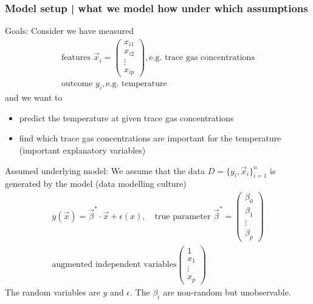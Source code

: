 \subsubsection{Model setup | what we model how under which assumptions}
\textcolor{green1}{Goals:} Consider we have measured
\begin{equation}
    \begin{gathered}
        \text{features } \vec{x}_i = \begin{pmatrix} x_{i1} \\ x_{i2} \\ \vdots \\ x_{ip} \end{pmatrix}, \text{e.g. trace gas concentrations} \\
        \text{outcome } y_i, \text{e.g. temperature}
    \end{gathered}
\end{equation}
and we want to
\begin{itemize}
    \item predict the temperature at given trace gas concentrations
    \item find which trace gas concentrations are important for the temperature (important explanatory variables)
\end{itemize}

\textcolor{blue1}{Assumed underlying model:} We assume that the data $D = \{ y_i, \vec{x}_i \}_{i=1}^n$ is generated by the model (data modelling culture)
\begin{equation}
    \begin{gathered}    
        y(\vec{x}) = \vec{\beta}^* \cdot \vec{x} + \epsilon(x), \quad \text{true parameter } \vec{\beta}^* = \left( \begin{array}{c} \beta_0 \\ \beta_1 \\ \vdots \\ \beta_p \end{array} \right) \\
        \text{augmented independent variables} \left( \begin{array}{c} 1 \\ x_1 \\ \vdots \\ x_p \end{array} \right)
    \end{gathered}
\end{equation}
The random variables are $y$ and $\epsilon$. The $\beta_i$ are non-random but unobservable.

